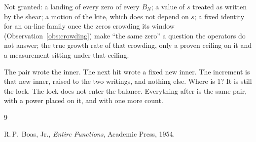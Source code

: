 \documentclass[10pt,a4paper]{article}
\theoremstyle{plain}
\theoremstyle{definition}
\theoremstyle{remark}
\begin{document}
Not granted:
a landing of every zero of every \(B_N\);
a value of \(s\) treated as written by the shear;
a motion of the kite, which does not depend on \(s\);
a fixed identity for an on-line family once the zeros crowding its window (Observation~\ref{obs:crowding}) make ``the same zero'' a question the operators do not answer;
the true growth rate of that crowding, only a proven ceiling on it and a measurement sitting under that ceiling.

The pair wrote the inner.
The next hit wrote a fixed new inner.
The increment is that new inner, raised to the two writings, and nothing else.
Where is \(1\)?
It is still the lock.
The lock does not enter the balance.
Everything after is the same pair, with a power placed on it, and with one more count.

\newpage
\begin{thebibliography}{9}

R.\,P.\ Boas, Jr., \emph{Entire Functions}, Academic Press, 1954.

\end{thebibliography}
\end{document}
